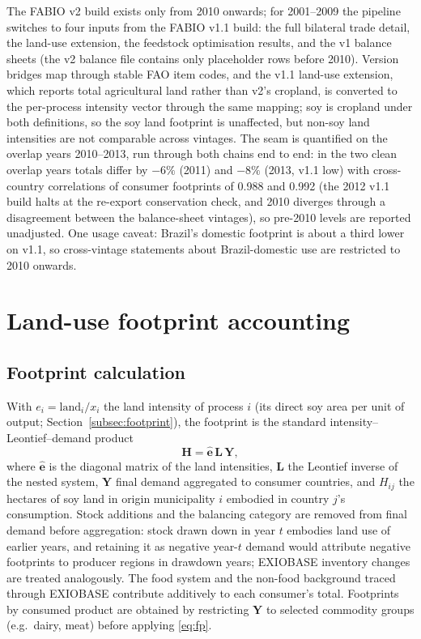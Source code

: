 \documentclass[pdflatex,sn-nature]{sn-jnl}%
\begin{document}
The FABIO v2 build exists only from 2010 onwards; for 2001--2009 the
pipeline switches to four inputs from the FABIO v1.1 build: the full
bilateral trade detail, the land-use extension, the feedstock
optimisation results, and the v1 balance sheets (the v2 balance file
contains only placeholder rows before 2010). Version bridges map
through stable FAO item codes, and the v1.1 land-use extension, which
reports total agricultural land rather than v2's cropland, is
converted to the per-process intensity vector through the same
mapping; soy is cropland under both definitions, so the soy land
footprint is unaffected, but non-soy land intensities are not
comparable across vintages. The seam is quantified on the overlap
years 2010--2013, run through both chains end to end: in the two clean
overlap years totals differ by $-6\%$ (2011) and $-8\%$ (2013, v1.1
low) with cross-country correlations of consumer footprints of 0.988
and 0.992 (the 2012 v1.1 build halts at the re-export conservation
check, and 2010 diverges through a disagreement between the
balance-sheet vintages), so pre-2010 levels are reported unadjusted.
One usage caveat: Brazil's domestic footprint is about a third
lower on v1.1, so cross-vintage statements about Brazil-domestic use
are restricted to 2010 onwards.

\section{Land-use footprint accounting}\label{app:footprint}

\subsection{Footprint calculation}\label{subsubsec:stressor}
With $e_i=\text{land}_i/x_i$ the land intensity of process $i$ (its
direct soy area per unit of output; Section~\ref{subsec:footprint}), the
footprint is the standard intensity--Leontief--demand product
\begin{equation}\label{eq:fp}
  \mathbf{H}=\hat{\mathbf{e}}\,\mathbf{L}\,\mathbf{Y},
\end{equation}
where $\hat{\mathbf{e}}$ is the diagonal matrix of the land intensities,
$\mathbf{L}$ the Leontief inverse of the nested system, $\mathbf{Y}$ final
demand aggregated to consumer countries, and $H_{ij}$ the hectares of soy
land in origin municipality $i$ embodied in country $j$'s consumption.
Stock additions and the balancing category are removed from final demand
before aggregation: stock drawn down in year $t$ embodies land use of
earlier years, and retaining it as negative year-$t$ demand would
attribute negative footprints to producer regions in drawdown years;
EXIOBASE inventory changes are treated analogously. The
food system and the non-food background traced through EXIOBASE
\cite{stadler2018exiobase} contribute additively to each
consumer's total. Footprints by consumed product are obtained by
restricting $\mathbf{Y}$ to selected commodity groups (e.g.\ dairy, meat)
before applying \eqref{eq:fp}.
\end{document}
